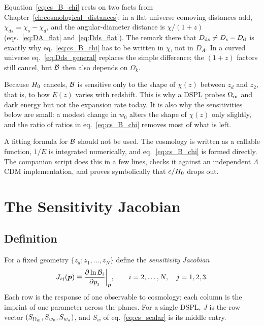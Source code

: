 \begin{bridge}
Equation~\eqref{eq:cs_B_chi} rests on two facts from
Chapter~\ref{ch:cosmological_distances}: in a flat universe comoving
distances add, $\chi_{ds}=\chi_s-\chi_d$, and the angular-diameter
distance is $\chi/(1+z)$ (eqs.~\ref{eq:DA_flat} and~\ref{eq:Dds_flat}).
The remark there that $D_{\mathrm{ds}}\neq D_{\mathrm{s}}-D_{\mathrm{d}}$ is exactly why
eq.~\eqref{eq:cs_B_chi} has to be written in $\chi$, not in $D_A$. In a
curved universe eq.~\eqref{eq:Dds_general} replaces the simple
difference; the $(1+z)$ factors still cancel, but $\mathcal{B}$ then also
depends on $\Omega_k$.
\end{bridge}

\begin{annotation}
Because $H_0$ cancels, $\mathcal{B}$ is sensitive only to the
shape of $\chi(z)$ between $z_d$ and $z_2$, that is, to how
$E(z)$ varies with redshift. This is why a DSPL probes $\Omega_{\mathrm{m}}$ and
dark energy but not the expansion rate today. It is also why the
sensitivities below are small: a modest change in $w_0$ alters the
shape of $\chi(z)$ only slightly, and the ratio of ratios in
eq.~\eqref{eq:cs_B_chi} removes most of what is left.
\end{annotation}

\begin{aside}
A fitting formula for $\mathcal{B}$ should not be used. The cosmology is
written as a callable function, $1/E$ is integrated numerically, and
eq.~\eqref{eq:cs_B_chi} is formed directly. The companion script does
this in a few lines,
checks it against an independent $\Lambda$CDM implementation, and proves
symbolically that $c/H_0$ drops out.
\end{aside}


\section{The Sensitivity Jacobian}
\label{sec:cs_jacobian}

\subsection{Definition}

For a fixed geometry $\{z_d;z_1,\dots,z_N\}$ define the
\emph{sensitivity Jacobian}
\begin{equation}
  J_{ij}(\bm{p})\equiv\frac{\partial \ln\mathcal{B}_i}{\partial p_j}\bigg|_{\bm{p}},
  \qquad i=2,\dots,N,\quad j=1,2,3 .
  \label{eq:cs_jacobian}
\end{equation}
Each row is the response of one observable to cosmology; each column is
the imprint of one parameter across the planes. For a single DSPL, $J$ is
the row vector $(S_{\Omega_{\mathrm{m}}},S_{w_0},S_{w_a})$, and $S_w$ of
eq.~\eqref{eq:cs_scalar} is its middle entry.

